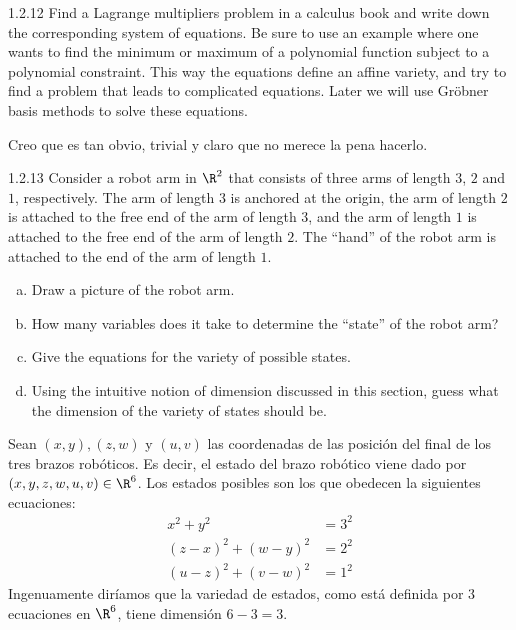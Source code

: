 \documentclass[twoside]{article}
\begin{document}
\newpage
\begin{ejercicio}{1.2.12}
Find a Lagrange multipliers problem in a calculus book and write down the corresponding system of equations. Be sure to use an example where one wants to find the minimum
or maximum of a polynomial function subject to a polynomial constraint. This way the equations define an affine variety, and try to find a problem that leads to complicated equations. Later we will use Gröbner basis methods to solve these equations.
\end{ejercicio}
\begin{solucion}
Creo que es tan obvio, trivial y claro que no merece la pena hacerlo.
\end{solucion}
\newpage
\begin{ejercicio}{1.2.13}
Consider a robot arm in $\R^2$ that consists of three arms of length $3$, $2$ and $1$, respectively.
The arm of length $3$ is anchored at the origin, the arm of length $2$ is attached to the free end of the arm of length $3$, and the arm of length $1$ is attached to the free end of the arm of length $2$.
The ``hand'' of the robot arm is attached to the end of the arm of length $1$.
\begin{enumerate}[a.]
\item Draw a picture of the robot arm.
\item How many variables does it take to determine the ``state'' of the robot arm?
\item Give the equations for the variety of possible states.
\item Using the intuitive notion of dimension discussed in this section, guess what the dimension of the variety of states should be.
\end{enumerate}
\end{ejercicio}
\begin{solucion}
Sean $(x,y), (z,w)$ y $(u,v)$ las coordenadas de las posición del final de los tres brazos robóticos.
Es decir, el estado del brazo robótico viene dado por $(x,y,z,w,u,v) \in \R^6$.
Los estados posibles son los que obedecen la siguientes ecuaciones:
\begin{align*}
x^2 + y^2 & = 3^2\\
(z-x)^2 + (w-y)^2 & = 2^2\\
(u-z)^2 + (v-w)^2 & = 1^2
\end{align*}
Ingenuamente diríamos que la variedad de estados, como está definida por $3$ ecuaciones en $\R^6$, tiene dimensión $6-3=3$.
\end{solucion}
\end{document}
